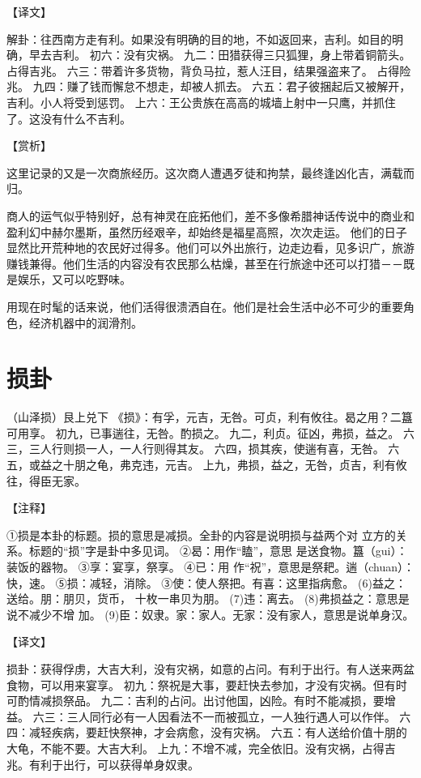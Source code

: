 \documentclass[a4paper,12pt,UTF8,twoside]{ctexbook}
\begin{document}
【译文】

解卦：往西南方走有利。如果没有明确的目的地，不如返回来，吉利。如目的明确，早去吉利。
初六：没有灾祸。
九二：田猎获得三只狐狸，身上带着铜箭头。占得吉兆。
六三：带着许多货物，背负马拉，惹人汪目，结果强盗来了。 占得险兆。
九四：赚了钱而懈怠不想走，却被人抓去。
六五：君子彼捆起后又被解开，吉利。小人将受到惩罚。
上六：王公贵族在高高的城墙上射中一只鹰，并抓住了。这没有什么不吉利。

【赏析】

这里记录的又是一次商旅经历。这次商人遭遇歹徒和拘禁，最终逢凶化吉，满载而归。

商人的运气似乎特别好，总有神灵在庇拓他们，差不多像希腊神话传说中的商业和盈利幻中赫尔墨斯，虽然历经艰辛，却始终是福星高照，次次走运。 他们的日子显然比开荒种地的农民好过得多。他们可以外出旅行，边走边看，见多识广，旅游赚钱兼得。他们生活的内容没有农民那么枯燥，甚至在行旅途中还可以打猎－－既是娱乐，又可以吃野味。

用现在时髦的话来说，他们活得很溃洒自在。他们是社会生活中必不可少的重要角色，经济机器中的润滑剂。

\chapter{损卦}

（山泽损）艮上兑下
《损》：有孚，元吉，无咎。可贞，利有攸往。曷之用？二簋可用享。
初九，已事遄往，无咎。酌损之。
九二，利贞。征凶，弗损，益之。
六三，三人行则损一人，一人行则得其友。
六四，损其疾，使遄有喜，无咎。
六五，或益之十朋之龟，弗克违，元吉。
上九，弗损，益之，无咎，贞吉，利有攸往，得臣无家。

【注释】

①损是本卦的标题。损的意思是减损。全卦的内容是说明损与益两个对 立方的关系。标题的“损”字是卦中多见词。
②曷：用作“瞌”，意思 是送食物。簋（gui）：装饭的器物。
③享：宴享，祭享。
④已：用 作“祝”，意思是祭耙。遄（chuan）：快，速。
⑤损：减轻，消除。
③使：使人祭把。有喜：这里指病愈。
(6)益之：送给。朋：朋贝，货币， 十枚一串贝为朋。
(7)违：离去。
(8)弗损益之：意思是说不减少不增 加。
(9)臣：奴隶。家：家人。无家：没有家人，意思是说单身汉。

【译文】

损卦：获得俘虏，大吉大利，没有灾祸，如意的占问。有利于出行。有人送来两盆食物，可以用来宴享。
初九：祭祝是大事，要赶快去参加，才没有灾祸。但有时可酌情减损祭品。
九二：吉利的占问。出讨他国，凶险。有时不能减损，要增益。
六三：三人同行必有一人因看法不一而被孤立，一人独行遇人可以作伴。
六四：减轻疾病，要赶快祭神，才会病愈，没有灾祸。
六五：有人送给价值十朋的大龟，不能不要。大吉大利。
上九：不增不减，完全依旧。没有灾祸，占得吉兆。有利于出行，可以获得单身奴隶。
\end{document}

